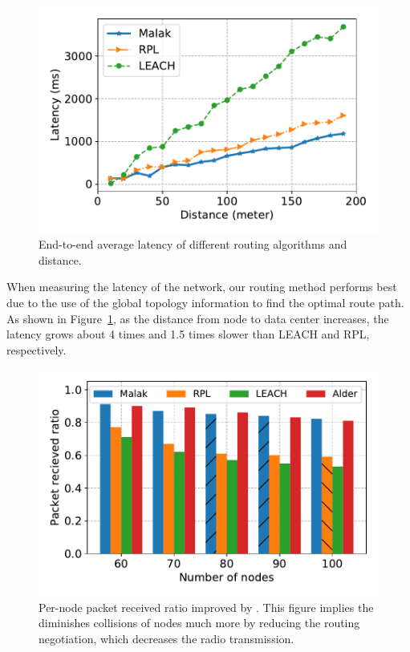 \begin{figure}[!h]
	\centering
	\includegraphics[width=.95\columnwidth]{Figure/latency}
	\vspace{-0.1in}
	\caption{End-to-end average latency of different routing algorithms and distance.
		\textnormal{
	}}
	\label{fig:latency}
\end{figure}

When measuring the latency of the network, our {\sdn} routing method
performs best due to the use of the global topology information to find the optimal
route path. As shown in Figure~\ref{fig:latency}, as the distance from node to
data center increases, the latency grows about 4 times and 1.5 times slower than
LEACH and RPL, respectively.

\begin{figure}[!h]
	\centering
	\includegraphics[width=.95\columnwidth]{Figure/packet_loss_ratio_with_size}
	\vspace{-0.1in}
	\caption{Per-node packet received ratio improved by {\sdn}.
		\textnormal{
			This figure implies the {\sdn} diminishes collisions of nodes much more by
			reducing the routing negotiation, which decreases the radio
			transmission.
	}}
	\label{fig:packet_loss_ratio_with_size}
\end{figure}

